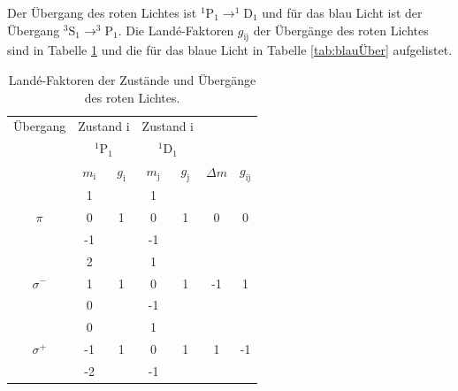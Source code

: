 Der Übergang des roten Lichtes ist $^1\text{P}_1 \rightarrow ^1\text{D}_1$ und für das 
blau Licht ist der Übergang $^3\text{S}_1 \rightarrow ^3\text{P}_1$.
Die Landé-Faktoren $g_{\text{ij}}$ der Übergänge des roten Lichtes sind in Tabelle \ref{tab:rotÜber} und die
für das blaue Licht in Tabelle \ref{tab:blauÜber} aufgelistet.
\FloatBarrier
\begin{table}
    \centering
    \caption{Landé-Faktoren der Zustände und Übergänge des roten Lichtes.}
    \label{tab:rotÜber}
    \begin{tabular}{c| c c| c c| c c}
        \toprule
        Übergang&\multicolumn{2}{c|}{Zustand i}&\multicolumn{2}{c|}{Zustand i}&\\
                &\multicolumn{2}{c|}{$^1\text{P}_1$}&\multicolumn{2}{c|}{$^1\text{D}_1$}&\\
        \midrule
        &$m_\text{i}$&$g_\text{i}$&$m_\text{j}$&$g_\text{j}$&$\Delta m $&$g_{\text{ij}}$\\
        \midrule
        \multirow{3}{*}{$\pi$}&1&\multirow{3}{*}{1}&1&\multirow{3}{*}{1}&\multirow{3}{*}{0}&\multirow{3}{*}{0}\\
        &0&&0&&&\\
        &-1&&-1&&&\\
        \hline
        \multirow{3}{*}{$\sigma^-$}&2&\multirow{3}{*}{1}&1&\multirow{3}{*}{1}&\multirow{3}{*}{-1}&\multirow{3}{*}{1}\\
        &1&&0&&&\\
        &0&&-1&&&\\
        \hline
        \multirow{3}{*}{$\sigma^+$}&0&\multirow{3}{*}{1}&1&\multirow{3}{*}{1}&\multirow{3}{*}{1}&\multirow{3}{*}{-1}\\
        &-1&&0&&&\\
        &-2&&-1&&&\\
        \bottomrule
    \end{tabular}
\end{table}
